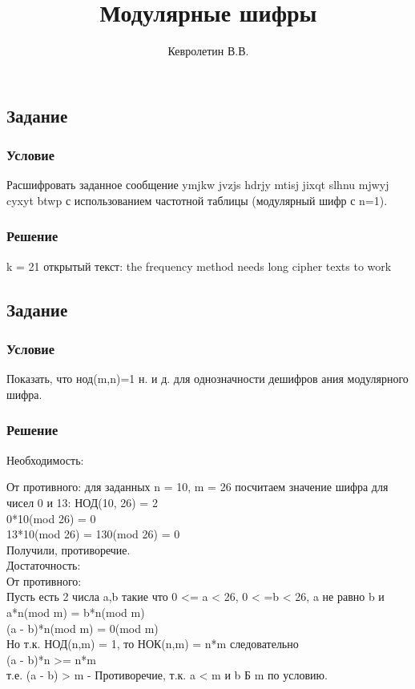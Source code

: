 \documentclass[10pt,a4paper]{article}
\author{Кевролетин В.В.}
\title{Модулярные шифры}
\begin{document}
\maketitle

\subsection*{Задание}
\subsubsection*{Условие}
Расшифровать заданное сообщение
ymjkw jvzjs hdrjy mtisj jixqt
slhnu mjwyj cyxyt btwp
с использованием частотной таблицы (модулярный шифр с n=1).
\subsubsection*{Решение}
k = 21
открытый текст:
the frequency method needs long cipher texts to work


\subsection*{Задание}
\subsubsection*{Условие}
Показать, что нод(m,n)=1 н. и д. для однозначности дешифров
ания модулярного шифра. 
\subsubsection*{Решение}
Необходимость:

От противного: для заданных n = 10, m = 26 посчитаем значение шифра для чисел
0 и 13:
НОД(10, 26) = 2 \\
0*10(mod 26) = 0 \\
13*10(mod 26) = 130(mod 26) = 0 \\
Получили, противоречие. \\

Достаточность: \\
От противного: \\
Пусть есть 2 числа a,b такие что 0 <= a < 26, 0 < =b < 26, a не равно
b и \\
a*n(mod m) = b*n(mod m) \\
(a - b)*n(mod m) = 0(mod m)  \\
Но т.к. НОД(n,m) = 1, то НОК(n,m) = n*m следовательно \\
(a - b)*n >= n*m  \\
т.е. (a - b) > m - Противоречие, т.к. a < m  и b Б m по условию. \\
\end{document}

